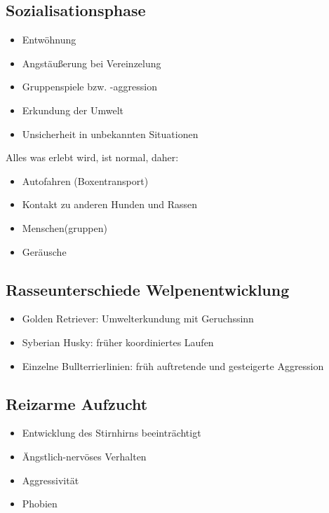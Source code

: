     \subsection{Sozialisationsphase}
        \begin{itemize}
            \item Entwöhnung
            \item Angstäußerung bei Vereinzelung
            \item Gruppenspiele bzw. -aggression
            \item Erkundung der Umwelt
            \item Unsicherheit in unbekannten Situationen
        \end{itemize}

        Alles was erlebt wird, ist \glqq normal\grqq{}, daher:
        \begin{itemize}
            \item Autofahren (Boxentransport)
            \item Kontakt zu anderen Hunden und Rassen
            \item Menschen(gruppen)
            \item Geräusche
        \end{itemize}

    \subsection{Rasseunterschiede Welpenentwicklung}
        \begin{itemize}
            \item Golden Retriever: Umwelterkundung mit Geruchssinn
            \item Syberian Husky: früher koordiniertes Laufen
            \item Einzelne Bullterrierlinien: früh auftretende und gesteigerte Aggression
        \end{itemize}

    \subsection{Reizarme Aufzucht}
        \begin{itemize}
            \item Entwicklung des Stirnhirns beeinträchtigt
            \item Ängstlich-nervöses Verhalten
            \item Aggressivität
            \item Phobien
        \end{itemize}

